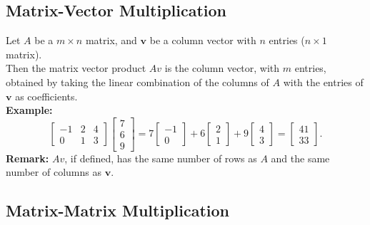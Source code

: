 \documentclass[a4paper, 9pt]{extarticle}
\begin{document}
\subsection*{Matrix-Vector Multiplication}
Let $A$ be a $m \times n$ matrix, and $\textbf{v}$ be a column vector with $n$ entries ($n \times 1$ matrix). \\[2ex]
Then the matrix vector product $Av$ is the column vector, with $m$ entries, obtained by taking the linear combination of the columns of $A$ with the entries of $\textbf{v}$ as coefficients. \\
\textbf{Example:}
$$
  \begin{bmatrix}
    -1 & 2 & 4 \\
    0  & 1 & 3
  \end{bmatrix}
  \begin{bmatrix}
    7 \\
    6 \\
    9
  \end{bmatrix}
  =
  7 \begin{bmatrix}
    -1 \\
    0
  \end{bmatrix}
  + 6 \begin{bmatrix}
    2 \\
    1
  \end{bmatrix}
  + 9 \begin{bmatrix}
    4 \\
    3
  \end{bmatrix}
  =
  \begin{bmatrix}
    41 \\
    33
  \end{bmatrix}.
$$
\textbf{Remark:} $Av$, if defined, has the same number of rows as $A$ and the same number of columns as $\textbf{v}$.

\subsection*{Matrix-Matrix Multiplication}
\end{document}
